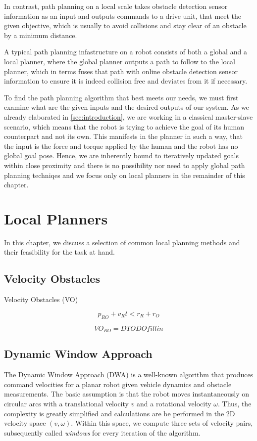 In contrast, path planning on a local scale takes obstacle detection sensor information as an input and outputs commands to a drive unit, that meet the given objective, which is usually to avoid collisions and stay clear of an obstacle by a minimum distance. 

A typical path planning infastructure on a robot consists of both a global and a local planner, where the global planner outputs a path to follow to the local planner, which in terms fuses that path with online obstacle detection sensor information to ensure it is indeed collision free and deviates from it if necessary.

To find the path planning algorithm that best meets our needs, we must first examine what are the given inputs and the desired outputs of our system. As we already elaborated in \cref{sec:introduction}, we are working in a classical master-slave scenario, which means that the robot is trying to achieve the goal of its human counterpart and not its own. This manifests in the planner in such a way, that the input is the force and torque applied by the human and the robot has no global goal pose. Hence, we are inherently bound to iteratively updated goals within close proximity and there is no possibility nor need to apply global path planning techniqes and we focus only on local planners in the remainder of this chapter.

\section{Local Planners}
In this chapter, we discuss a selection of common local planning methods and their feasibility for the task at hand.
\subsection{Velocity Obstacles}
Velocity Obstacles (VO) \citep{fiorini1998motion}

\begin{equation}
p_{RO} + v_R t < r_R +r_O
	\label{eq:vo_condition}
\end{equation}

\begin{equation}
VO_{RO} = D TODO fill in
\end{equation}
\subsection{Dynamic Window Approach}
The Dynamic Window Approach (DWA) \citep{fox1997dynamic} is a well-known algorithm that produces command velocities for a planar robot given vehicle dynamics and obstacle measurements. The basic assumption is that the robot moves instantaneously on circular arcs with a translational velocity $v$ and a rotational velocity $\omega$. Thus, the complexity is greatly simplified and calculations are be performed in the 2D velocity space $(v,\omega)$. Within this space, we compute three sets of velocity pairs,  subsequently called \emph{windows} for every iteration of the algorithm.

